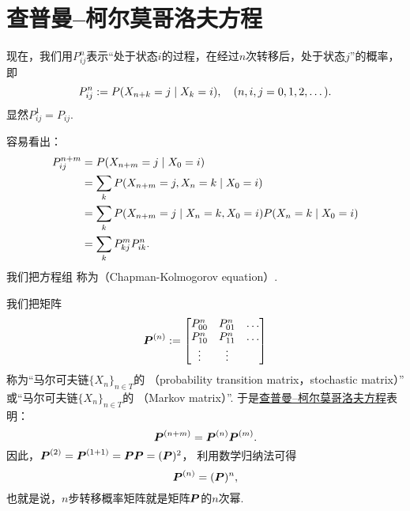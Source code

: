 \section{查普曼--柯尔莫哥洛夫方程}
现在，我们用\(P^n_{ij}\)表示“处于状态\(i\)的过程，在经过\(n\)次转移后，处于状态\(j\)”的概率，
即\begin{equation*}
	P^n_{ij}
	:=
	P(
		X_{n+k} = j
		\mid
		X_k = i
	),
	\quad(n,i,j=0,1,2,\dotsc).
\end{equation*}
显然\(P^1_{ij} = P_{ij}\).

容易看出：\begin{align}
	P^{n+m}_{ij}
	&= P(X_{n+m} = j \mid X_0 = i) \notag\\
	&= \sum_k P(X_{n+m} = j, X_n = k \mid X_0 = i) \notag\\
	&= \sum_k P(X_{n+m} = j \mid X_n = k, X_0 = i) P(X_n = k \mid X_0 = i) \notag\\
	&= \sum_k P^m_{kj} P^n_{ik}.
		\label{equation:马尔可夫链.CK方程}
\end{align}
我们把方程组 
称为（Chapman-Kolmogorov equation）.

我们把矩阵\begin{equation*}
	\boldsymbol{P}^{(n)}
	:= \begin{bmatrix}
		P^n_{00} & P^n_{01} & \dots \\
		P^n_{10} & P^n_{11} & \dots \\
		\vdots & \vdots & \\
	\end{bmatrix}
\end{equation*}
称为“马尔可夫链\(\{X_n\}_{n \in T}\)的 （probability transition matrix，stochastic matrix）”
或“马尔可夫链\(\{X_n\}_{n \in T}\)的 （Markov matrix）”.
于是\hyperref[equation:马尔可夫链.CK方程]{查普曼--柯尔莫哥洛夫方程}表明：\begin{equation}
	\boldsymbol{P}^{(n+m)}
	= \boldsymbol{P}^{(n)} \boldsymbol{P}^{(m)}.
\end{equation}
因此，\(
	\boldsymbol{P}^{(2)}
	= \boldsymbol{P}^{(1+1)}
	= \boldsymbol{P} \boldsymbol{P}
	= (\boldsymbol{P})^2
\)，
利用数学归纳法可得\begin{equation}
	\boldsymbol{P}^{(n)}
	= (\boldsymbol{P})^n,
\end{equation}
也就是说，\(n\)步转移概率矩阵就是矩阵\(\boldsymbol{P}\)的\(n\)次幂.
